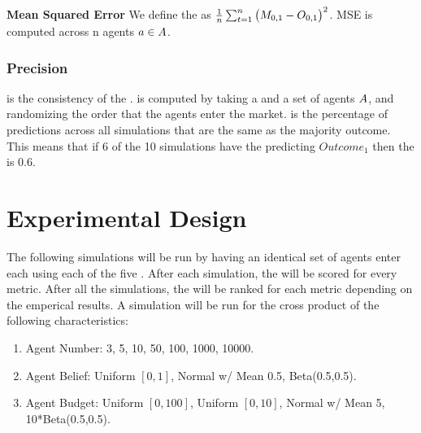 \textbf{Mean Squared Error}
We define the  as $\frac{1}{n}\sum_{t=1}^{n} \big(M_{0,1} - O_{0,1}\big)^2$. MSE
is computed across n agents $a\in A$. 

\subsubsection{Precision}
 is the consistency of the .  is computed by taking a 
and a set of agents $A$, and randomizing the order that the agents enter the market.  is the
percentage of predictions across all simulations that are the same as the majority outcome. This means that if 6 of
the 10 simulations have the  predicting $Outcome_{1}$ then the  is 0.6.

\section{Experimental Design}
The following simulations will be run by having an identical set of agents enter each  using each
of the five . After each simulation, the  will be scored for every
metric. After all the simulations, the  will be ranked for each metric depending on the emperical
results. A simulation will be run for the cross product of the following characteristics:
\begin{enumerate}
  \item Agent Number: 3, 5, 10, 50, 100, 1000, 10000.
  \item Agent Belief: Uniform $[0,1]$, Normal w/ Mean 0.5, Beta(0.5,0.5).
  \item Agent Budget: Uniform $[0,100]$, Uniform $[0,10]$, Normal w/ Mean 5, 10*Beta(0.5,0.5).
\end{enumerate}
